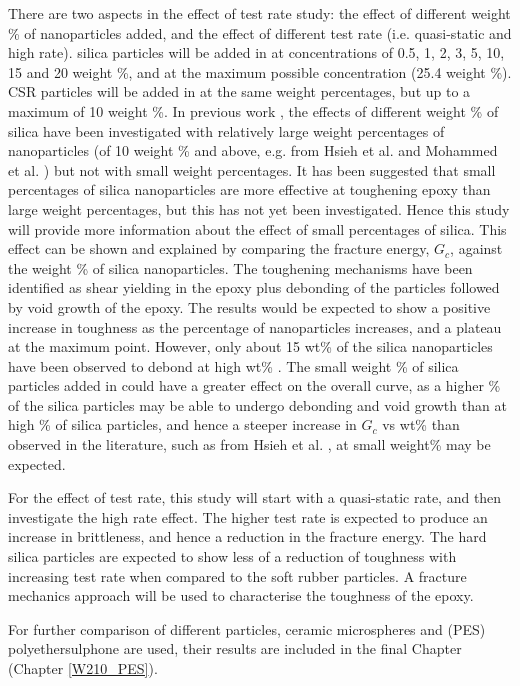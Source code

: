 \documentclass[numbers=noendperiod,chapterprefix=on]{icldt} %
\begin{document}
There are two aspects in the effect of test rate study: the effect of different weight \% of nanoparticles added, and the effect of different test rate (i.e. quasi-static and high rate). silica particles will be added in at concentrations of 0.5, 1, 2, 3, 5, 10, 15 and 20 weight \%, and at the maximum possible concentration (25.4 weight \%). CSR particles will be added in at the same weight percentages, but up to a maximum of 10 weight \%. In previous work \cite{Johnsen2007,Hsieh2010a,Hsieh2010} , the effects of different weight \% of silica have been investigated with relatively large weight percentages of nanoparticles (of 10 weight \% and above, e.g. from Hsieh et al. \cite{Hsieh2010a} and Mohammed et al. \cite{Mohammed2008}) but not with small weight percentages. It has been suggested that small percentages of silica nanoparticles are more effective at toughening epoxy than large weight percentages, but this has not yet been investigated. Hence this study will provide more information about the effect of small percentages of silica. This effect can be shown and explained by comparing the fracture energy, $G_c$, against the weight \% of silica nanoparticles. The toughening mechanisms have been identified as shear yielding in the epoxy plus debonding of the particles followed by void growth of the epoxy. The results would be expected to show a positive increase in toughness as the percentage of nanoparticles increases, and a plateau at the maximum point. However, only about 15 wt\% of the silica nanoparticles have been observed to debond at high wt\% \cite{Hsieh2010a}. The small weight \% of silica particles added in could have a greater effect on the overall curve, as a higher \% of the silica particles may be able to undergo debonding and void growth than at high \% of silica particles, and hence a steeper increase in $G_c$ vs wt\% than observed in the literature, such as from Hsieh et al. \cite{Hsieh2010a}, at small weight\% may be expected.

For the effect of test rate, this study will start with a quasi-static rate, and then investigate the high rate effect. The higher test rate is expected to produce an increase in brittleness, and hence a reduction in the fracture energy. The hard silica particles are expected to show less of a reduction of toughness with increasing test rate when compared to the soft rubber particles. A fracture mechanics approach will be used to characterise the toughness of the epoxy. 

For further comparison of different particles, ceramic microspheres and (PES) polyethersulphone are used, their results are included in the final Chapter (Chapter \ref{W210_PES}). 
\end{document}
